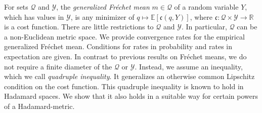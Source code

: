 For sets $\mathcal Q$ and $\mathcal Y$, the \textit{generalized Fréchet mean} $m \in \mathcal Q$ of a random variable $Y$, which has values in $\mathcal Y$, is any minimizer of $q\mapsto \mathbb E[\mathfrak c(q,Y)]$, where $\mathfrak c \colon \mathcal Q \times \mathcal Y \to \mathbb R$ is a cost function. 
There are little restrictions to $\mathcal Q$ and $\mathcal Y$. In particular, $\mathcal Q$ can be a non-Euclidean metric space.
We provide convergence rates for the empirical generalized Fréchet mean. 
Conditions for rates in probability and rates in expectation are given.
In contrast to previous results on Fréchet means, we do not require a finite diameter of the $\mathcal Q$ or $\mathcal Y$. Instead, we assume an inequality, which we call \textit{quadruple inequality}. It generalizes an otherwise common Lipschitz condition on the cost function. This quadruple inequality is known to hold in Hadamard spaces. We show that it also holds in a suitable way for certain powers of a Hadamard-metric.